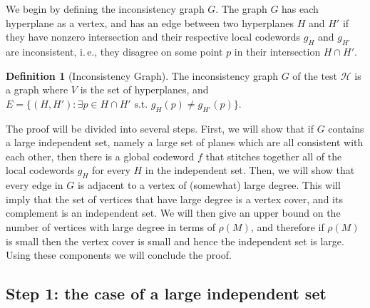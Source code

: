 \documentclass[11pt]{article}
\numberwithin{equation}{section}
\theoremstyle{definition}
\newtheorem{definition}[theorem]{Definition}
\theoremstyle{plain}
\newcommand{\ie}{i.\,e.}
\theoremstyle{plain}
\newcommand{\colored}{}
\newcommand{\robust}{\colored{\rho}} %
\newcommand{\tester}{\colored{\mathcal H}} %
\newcommand{\plane}{{\colored{H}}} %
\newcommand{\otherplane}{\colored{ {H'}}} %
\newcommand{\testerinput}{\colored{M}} %
\newcommand{\closestlocalword}[1]{ \colored{g_{#1}}} %
\newcommand{\closestglobalword}{\colored{f}} %
\newcommand{\st}{\colored{\text{ s.t. }}}
\begin{document}
We begin by defining the inconsistency graph $G$. The graph $G$ has each hyperplane as a vertex, and has an edge between two hyperplanes $\plane$ and $\otherplane$ if they have nonzero intersection and their respective local codewords $\closestlocalword{\plane}$ and $\closestlocalword{\otherplane}$ are inconsistent, \ie, they disagree on some point $p$ in their intersection $\plane \cap \otherplane$.

%
\begin{definition}[Inconsistency Graph]\label{def:graph}
The inconsistency graph $G$ of the test $\tester$ is a graph where $V$ is the set of hyperplanes, and $E = \{(\plane, \otherplane) : \exists p \in \plane \cap \otherplane \st \closestlocalword{\plane}(p) \ne \closestlocalword{\otherplane}(p)\}$.
\end{definition}
%

The proof will be divided into several steps. First, we will show that if $G$ contains a large independent set, namely a large set of planes which are all consistent with each other, then there is a global codeword $\closestglobalword$ that stitches together all of the local codewords $\closestlocalword{\plane}$ for every $\plane$ in the independent set. Then, we will show that every edge in $G$ is adjacent to a vertex of (somewhat) large degree. This will imply that the set of vertices that have large degree is a vertex cover, and its complement is an independent set.
We will then
%
give an upper bound on  %
the number of vertices with large degree in terms of $\robust(\testerinput)$, and therefore if $\robust(\testerinput)$ is small then the vertex cover is small and hence the independent set is large.
Using these components we will conclude the proof.

%
%
\subsection{Step 1: the case of a large independent set}
\end{document}
